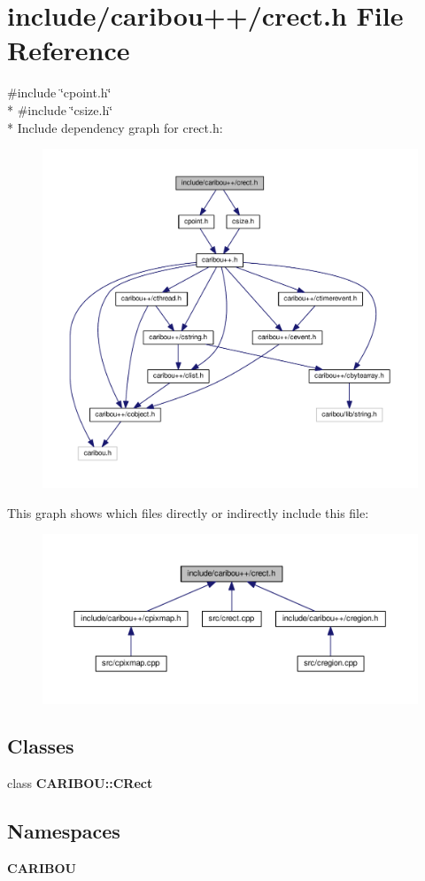 \section{include/caribou++/crect.h File Reference}
\label{crect_8h}
{\ttfamily \#include \char`\"{}cpoint.\+h\char`\"{}}\\*
{\ttfamily \#include \char`\"{}csize.\+h\char`\"{}}\\*
Include dependency graph for crect.\+h\+:
\nopagebreak
\begin{figure}[H]
\begin{center}
\leavevmode
\includegraphics[width=350pt]{crect_8h__incl}
\end{center}
\end{figure}
This graph shows which files directly or indirectly include this file\+:
\nopagebreak
\begin{figure}[H]
\begin{center}
\leavevmode
\includegraphics[width=350pt]{crect_8h__dep__incl}
\end{center}
\end{figure}
\subsection*{Classes}
\begin{DoxyCompactItemize}
\item 
class {\bf C\+A\+R\+I\+B\+O\+U\+::\+C\+Rect}
\end{DoxyCompactItemize}
\subsection*{Namespaces}
\begin{DoxyCompactItemize}
\item 
 {\bf C\+A\+R\+I\+B\+OU}
\end{DoxyCompactItemize}
